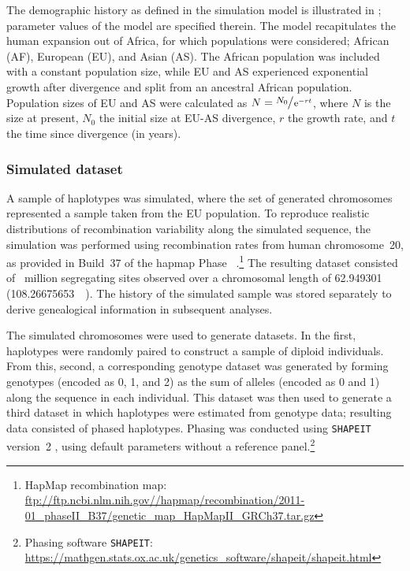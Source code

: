 %

%

The demographic history as defined in the simulation model is illustrated in ; parameter values of the model are specified therein.
The model recapitulates the human expansion out of Africa, for which  populations were considered; African (AF), European (EU), and Asian (AS).
The African population was included with a constant population size, while EU and AS experienced exponential growth after divergence and split from an ancestral African population.
Population sizes of EU and AS were calculated as ${N = \large \sfrac{N_0}{\,\mathrm{e}^{-r t}}}$, where $N$ is the size at present, $N_0$ the initial size at EU-AS divergence, $r$ the growth rate, and $t$ the time since divergence (in years).


%
\subsubsection{Simulated dataset}
%

A sample of  haplotypes was simulated, where the set of generated chromosomes represented a sample taken from the EU population.
To reproduce realistic distributions of recombination variability along the simulated sequence, the simulation was performed using recombination rates from human chromosome~20, as provided in Build~37 of the \gls{hapmap} Phase~ \citep{Frazer:2007kha, InternationalHapMapConsortium:2010en}.\footnote{HapMap recombination map: \url{ftp://ftp.ncbi.nlm.nih.gov//hapmap/recombination/2011-01_phaseII_B37/genetic_map_HapMapII_GRCh37.tar.gz} }
The resulting dataset consisted of ~million segregating sites observed over a chromosomal length of \SI{62.949301}{\mega\basepair} (\SI{108.26675653}{\centi\morgan}).
The history of the simulated sample was stored separately to derive genealogical information in subsequent analyses.

The simulated chromosomes were used to generate  datasets.
In the first, haplotypes were randomly paired to construct a sample of  diploid individuals.
From this, second, a corresponding genotype dataset was generated by forming genotypes (encoded as 0, 1, and 2) as the sum of alleles (encoded as 0 and 1) along the sequence in each individual.
This dataset was then used to generate a third dataset in which haplotypes were estimated from genotype data;
\ie resulting data consisted of phased haplotypes.
Phasing was conducted using \texttt{SHAPEIT} version~2 \citep{Delaneau:2008dk,Delaneau:2013hi}, using default parameters without a reference panel.\footnote{Phasing software \texttt{SHAPEIT}: \url{https://mathgen.stats.ox.ac.uk/genetics_software/shapeit/shapeit.html} }


